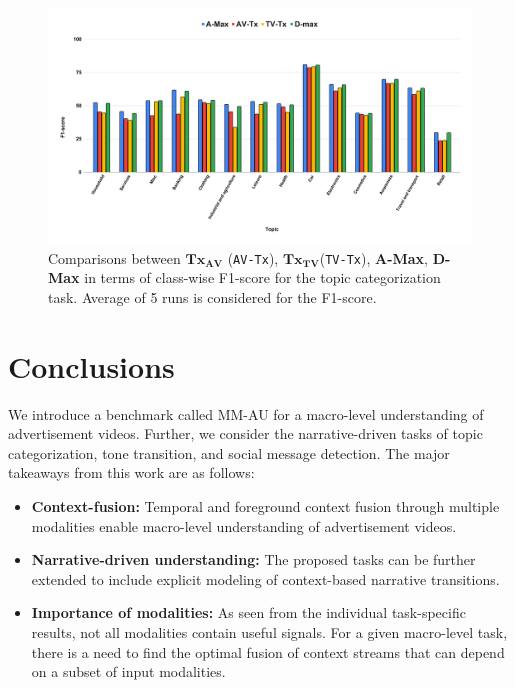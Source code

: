  \begin{figure}[h!]
    \includegraphics[width=\textwidth]{figures/multimodal_baselines_f1_score_topic.pdf}
    \caption{Comparisons between $\mathbf{Tx_{AV}}$ (\texttt{AV-Tx}), $\mathbf{Tx_{TV}}$(\texttt{TV-Tx}), \textbf{A-Max}, \textbf{D-Max} in terms of class-wise F1-score for the topic categorization task. Average of 5 runs is considered for the F1-score.}
    \label{topic_multimodal}
\end{figure}

\section{Conclusions}

We introduce a benchmark called MM-AU for a macro-level understanding of advertisement videos. Further, we consider the narrative-driven tasks of topic categorization, tone transition, and social message detection. 
The major takeaways from this work are as follows:

\begin{itemize}

\item \textbf{Context-fusion:} Temporal and foreground context fusion through multiple modalities enable macro-level understanding of advertisement videos.

\item \textbf{Narrative-driven understanding:} The proposed tasks can be further extended to include explicit modeling of context-based narrative transitions.

\item \textbf{Importance of modalities:} As seen from the individual task-specific results, not all modalities contain useful signals. For a given macro-level task, there is a need to find the optimal fusion of context streams that can depend on a subset of input modalities.

\end{itemize}



